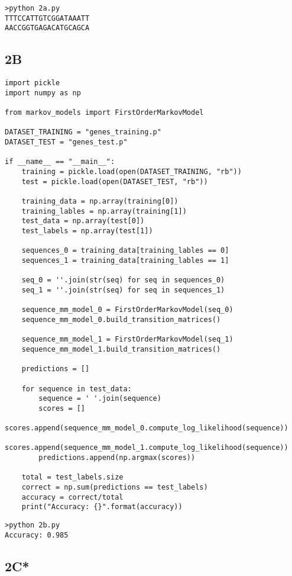 \documentclass[12pt]{article}
\begin{document}
\begin{flushleft}
		\begin{lstlisting}
>python 2a.py
TTTCCATTGTCGGATAAATT
AACCGGTGAGACATGCAGCA

		\end{lstlisting}
		
		\subsection*{2B}
		
		\begin{lstlisting}
import pickle
import numpy as np 

from markov_models import FirstOrderMarkovModel

DATASET_TRAINING = "genes_training.p"
DATASET_TEST = "genes_test.p"

if __name__ == "__main__":
	training = pickle.load(open(DATASET_TRAINING, "rb"))
	test = pickle.load(open(DATASET_TEST, "rb"))
	
	training_data = np.array(training[0])
	training_lables = np.array(training[1])
	test_data = np.array(test[0])
	test_labels = np.array(test[1])
	
	sequences_0 = training_data[training_lables == 0]
	sequences_1 = training_data[training_lables == 1]
	
	seq_0 = ''.join(str(seq) for seq in sequences_0)
	seq_1 = ''.join(str(seq) for seq in sequences_1)
	
	sequence_mm_model_0 = FirstOrderMarkovModel(seq_0)
	sequence_mm_model_0.build_transition_matrices()
	
	sequence_mm_model_1 = FirstOrderMarkovModel(seq_1)
	sequence_mm_model_1.build_transition_matrices()
	
	predictions = []
	
	for sequence in test_data:
		sequence = ' '.join(sequence)
		scores = []
		scores.append(sequence_mm_model_0.compute_log_likelihood(sequence))
		scores.append(sequence_mm_model_1.compute_log_likelihood(sequence))
		predictions.append(np.argmax(scores))
	
	total = test_labels.size
	correct = np.sum(predictions == test_labels)
	accuracy = correct/total
	print("Accuracy: {}".format(accuracy))

		\end{lstlisting}
		
		\begin{lstlisting}
>python 2b.py
Accuracy: 0.985
		\end{lstlisting}
		
		\subsection*{2C*}
		

\end{flushleft}
\end{document}
